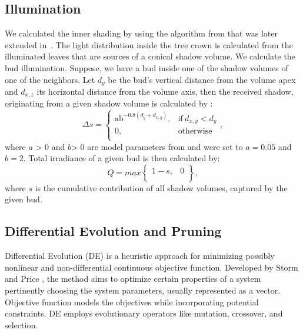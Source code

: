 \subsection{Illumination}

We calculated the inner shading by using the algorithm from \cite{palubicki_self-organizing_2009}
that was later extended in~\cite{pirk_plastic_2012,stava_inverse_2014,strnad_novel_2017}. The light distribution
inside the tree crown is calculated from the illuminated leaves that are
sources of a conical shadow volume. We calculate the bud illumination.
Suppose, we have a bud inside one of the shadow volumes of one of the
neighbors. Let \(d_{y}\) be the bud's vertical distance from the volume
apex and \(d_{x,z}\) its horizontal distance from the volume axis, then
the received shadow, originating from a given shadow volume is
calculated by \cite{strnad_novel_2017}:
\begin{equation}
\Delta s = \left\{ \begin{matrix}
\text{ab}^{- 0.8\left( d_{y} + d_{x,y} \right)}, & \mathrm{\text{if}}\ d_{x,y} < d_{y} \\
0, & \mathrm{otherwise} \\
\end{matrix},
\end{equation}
where \(a\) \textgreater{} 0 and \(b\)\textgreater{} 0 are model
parameters from \cite{palubicki_self-organizing_2009} and were set to \(a = 0.05\) and \(b = 2\).
Total irradiance of a given bud is then calculated by:
\begin{equation}
  Q = max\begin{Bmatrix}
1 - s, & 0 \\
\end{Bmatrix},  
\end{equation}
where \(s\) is the cumulative contribution of all shadow volumes,
captured by the given bud.

\subsection{Differential Evolution and Pruning}
Differential Evolution (DE) is a heuristic approach for minimizing
possibly nonlinear and non-differential continuous objective function.
Developed by Storm and Price \cite{storn_differential_1997}, the method aims to optimize
certain properties of a system pertinently choosing the system
parameters, usually represented as a vector. Objective function models
the objectives while incorporating potential constraints. DE employs
evolutionary operators like mutation, crossover, and selection.

